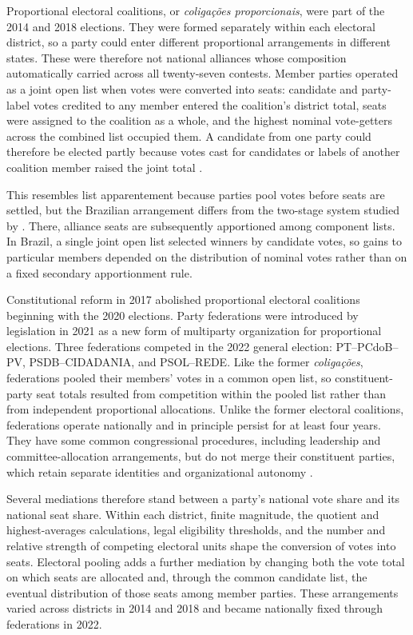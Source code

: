 \documentclass[11pt]{article}
\begin{document}
Proportional electoral coalitions, or \emph{coligações proporcionais}, were
part of the 2014 and 2018 elections. They were formed separately within each
electoral district, so a party could enter different proportional arrangements
in different states. These were therefore not national alliances whose
composition automatically carried across all twenty-seven contests. Member
parties operated as a joint open list when votes were converted into seats:
candidate and party-label votes credited to any member entered the coalition's
district total, seats were assigned to the coalition as a whole, and the
highest nominal vote-getters across the combined list occupied them. A candidate
from one party could therefore be elected partly because votes cast for
candidates or labels of another coalition member raised the joint total
\parencite{nicolau2006openlist}.

This resembles list apparentement because parties pool votes before seats are
settled, but the Brazilian arrangement differs from the two-stage system studied
by \textcite{pukelsheimLeutgaeb2013apparentements}. There, alliance seats are
subsequently apportioned among component lists. In Brazil, a single joint open
list selected winners by candidate votes, so gains to particular members depended
on the distribution of nominal votes rather than on a fixed secondary
apportionment rule.


Constitutional reform in 2017 abolished proportional electoral coalitions
beginning with the 2020 elections. Party federations were introduced by
legislation in 2021 as a new form of multiparty organization for proportional
elections. Three federations competed in the 2022 general election:
PT--PCdoB--PV, PSDB--CIDADANIA, and PSOL--REDE. Like the former
\emph{coligações}, federations pooled their members' votes in a common open
list, so constituent-party seat totals resulted from competition within the
pooled list rather than from independent proportional allocations. Unlike the
former electoral coalitions, federations operate nationally and in principle
persist for at least four years. They have some common congressional procedures,
including leadership and committee-allocation arrangements, but do not merge
their constituent parties, which retain separate identities and organizational
autonomy \parencite{fischMesquita2022}.



Several mediations therefore stand between a party's national vote share and its national seat share. Within each district, finite magnitude, the quotient and highest-averages calculations, legal eligibility thresholds, and the number and relative strength of competing electoral units shape the conversion of votes into seats. Electoral pooling adds a further mediation by changing both the vote total on which seats are allocated and, through the common candidate list, the eventual distribution of those seats among member parties. These arrangements varied across districts in 2014 and 2018 and became nationally fixed through federations in 2022.
\end{document}
